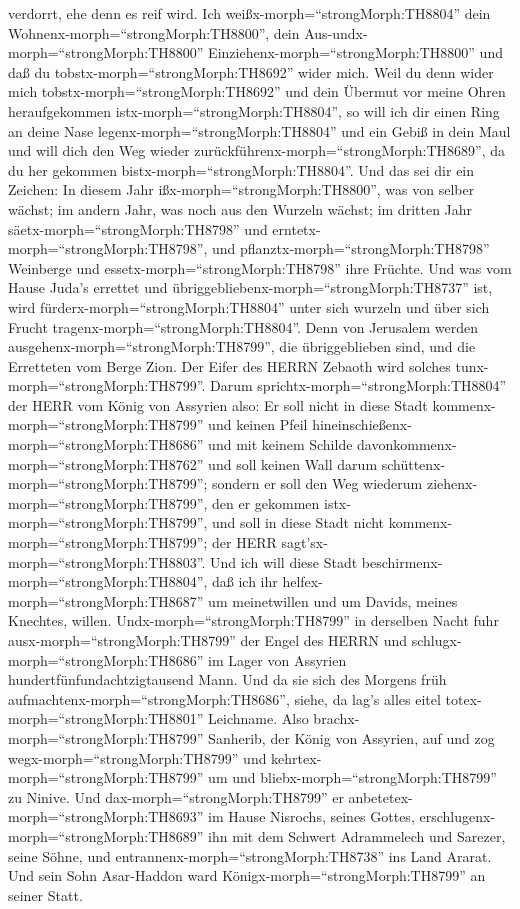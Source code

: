 verdorrt, ehe denn es reif wird.  Ich
weißx-morph=``strongMorph:TH8804'' dein
Wohnenx-morph=``strongMorph:TH8800'', dein
Aus-undx-morph=``strongMorph:TH8800''
Einziehenx-morph=``strongMorph:TH8800'' und daß du
tobstx-morph=``strongMorph:TH8692'' wider mich.  Weil du
denn wider mich tobstx-morph=``strongMorph:TH8692'' und dein Übermut vor
meine Ohren heraufgekommen istx-morph=``strongMorph:TH8804'', so will
ich dir einen Ring an deine Nase legenx-morph=``strongMorph:TH8804'' und
ein Gebiß in dein Maul und will dich den Weg wieder
zurückführenx-morph=``strongMorph:TH8689'', da du her gekommen
bistx-morph=``strongMorph:TH8804''.  Und das sei dir ein
Zeichen: In diesem Jahr ißx-morph=``strongMorph:TH8800'', was von selber
wächst; im andern Jahr, was noch aus den Wurzeln wächst; im dritten Jahr
säetx-morph=``strongMorph:TH8798'' und
erntetx-morph=``strongMorph:TH8798'', und
pflanztx-morph=``strongMorph:TH8798'' Weinberge und
essetx-morph=``strongMorph:TH8798'' ihre Früchte.  Und was
vom Hause Juda's errettet und
übriggebliebenx-morph=``strongMorph:TH8737'' ist, wird
fürderx-morph=``strongMorph:TH8804'' unter sich wurzeln und über sich
Frucht tragenx-morph=``strongMorph:TH8804''.  Denn von
Jerusalem werden ausgehenx-morph=``strongMorph:TH8799'', die
übriggeblieben sind, und die Erretteten vom Berge Zion. Der Eifer des
HERRN Zebaoth wird solches tunx-morph=``strongMorph:TH8799''.
 Darum sprichtx-morph=``strongMorph:TH8804'' der HERR vom
König von Assyrien also: Er soll nicht in diese Stadt
kommenx-morph=``strongMorph:TH8799'' und keinen Pfeil
hineinschießenx-morph=``strongMorph:TH8686'' und mit keinem Schilde
davonkommenx-morph=``strongMorph:TH8762'' und soll keinen Wall darum
schüttenx-morph=``strongMorph:TH8799'';  sondern er soll
den Weg wiederum ziehenx-morph=``strongMorph:TH8799'', den er gekommen
istx-morph=``strongMorph:TH8799'', und soll in diese Stadt nicht
kommenx-morph=``strongMorph:TH8799''; der HERR
sagt'sx-morph=``strongMorph:TH8803''.  Und ich will diese
Stadt beschirmenx-morph=``strongMorph:TH8804'', daß ich ihr
helfex-morph=``strongMorph:TH8687'' um meinetwillen und um Davids,
meines Knechtes, willen.  Undx-morph=``strongMorph:TH8799''
in derselben Nacht fuhr ausx-morph=``strongMorph:TH8799'' der Engel des
HERRN und schlugx-morph=``strongMorph:TH8686'' im Lager von Assyrien
hundertfünfundachtzigtausend Mann. Und da sie sich des Morgens früh
aufmachtenx-morph=``strongMorph:TH8686'', siehe, da lag's alles eitel
totex-morph=``strongMorph:TH8801'' Leichname.  Also
brachx-morph=``strongMorph:TH8799'' Sanherib, der König von Assyrien,
auf und zog wegx-morph=``strongMorph:TH8799'' und
kehrtex-morph=``strongMorph:TH8799'' um und
bliebx-morph=``strongMorph:TH8799'' zu Ninive.  Und
dax-morph=``strongMorph:TH8799'' er
anbetetex-morph=``strongMorph:TH8693'' im Hause Nisrochs, seines Gottes,
erschlugenx-morph=``strongMorph:TH8689'' ihn mit dem Schwert Adrammelech
und Sarezer, seine Söhne, und entrannenx-morph=``strongMorph:TH8738''
ins Land Ararat. Und sein Sohn Asar-Haddon ward
Königx-morph=``strongMorph:TH8799'' an seiner Statt.

